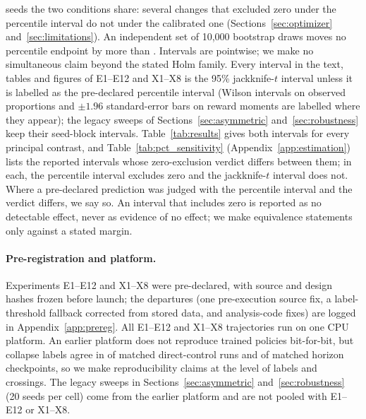seeds the two conditions share: several changes that excluded zero under the percentile interval do not under the
calibrated one (Sections~\ref{sec:optimizer} and~\ref{sec:limitations}). An independent set of 10,000 bootstrap draws
moves no percentile endpoint by more than \VrvMCShift{}. Intervals are pointwise; we make no simultaneous claim beyond
the stated Holm family. Every interval in the text, tables and figures of E1--E12 and X1--X8 is the 95\% jackknife-$t$ interval unless it is
labelled as the pre-declared percentile interval (Wilson intervals on observed proportions and $\pm1.96$ standard-error
bars on reward moments are labelled where they appear); the legacy sweeps of Sections~\ref{sec:asymmetric} and~\ref{sec:robustness}
keep their seed-block intervals. Table~\ref{tab:results} gives both intervals for every principal contrast, and
Table~\ref{tab:pct_sensitivity} (Appendix~\ref{app:estimation}) lists the \VpctSensN{} reported intervals whose zero-exclusion
verdict differs between them; in each, the percentile interval excludes zero and the jackknife-$t$ interval does not.
Where a pre-declared prediction was judged with the percentile interval and the verdict differs, we say so. An interval that includes zero is reported as no detectable effect, never as evidence of no
effect; we make equivalence statements only against a stated margin.

\paragraph{Pre-registration and platform.}
Experiments E1--E12 and X1--X8 were pre-declared, with source and design hashes frozen before launch; the
departures (one pre-execution source fix, a label-threshold fallback corrected from stored data, and
analysis-code fixes) are logged in Appendix~\ref{app:prereg}. All E1--E12 and X1--X8 trajectories run on one CPU
platform. An earlier platform does not reproduce trained policies
bit-for-bit, but collapse labels agree in \VfourAgreeControl{} of matched direct-control runs and
\VfourAgreeHorizon{} of matched horizon checkpoints, so we make reproducibility claims at the level of
labels and crossings. The legacy sweeps in Sections~\ref{sec:asymmetric} and~\ref{sec:robustness} (20 seeds
per cell) come from the earlier platform and are not pooled with E1--E12 or X1--X8.


\FloatBarrier

